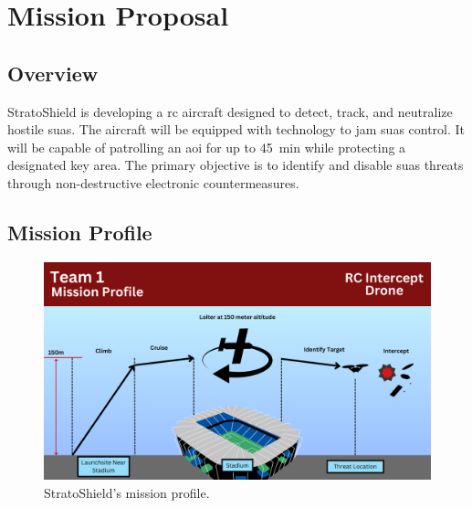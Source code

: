 \chapter{Mission Proposal}\label{cp:mission_proposal}

\section{Overview}

StratoShield is developing a \acrfull{rc} aircraft designed to detect, track, and neutralize hostile \acrshort{suas}. The aircraft will be equipped with technology to jam  \acrshort{suas} control. It will be capable of patrolling an \acrfull{aoi} for up to \qty{45}{\minute} while protecting a designated key area. The primary objective is to identify and disable \acrshort{suas} threats through non-destructive electronic countermeasures.

\section{Mission Profile}

\begin{figure}[htpb]
    \centering
    \includegraphics[width=\linewidth]{Figures/AERE 4610 Team 1 Mission Profile v1.0.0.pdf}
    \caption[StratoShield mission profile]{StratoShield's mission profile.}
    \label{fig:mission_profile}
\end{figure}
